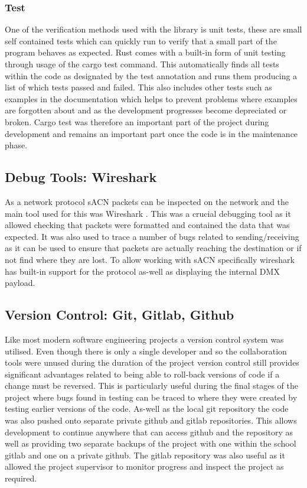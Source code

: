 \documentclass[11pt,a4paper]{article}
\begin{document}
\subsubsection{Test}
One of the verification methods used with the library is unit tests, these are small self contained tests which can quickly run to verify that a small part of the program behaves as expected. Rust comes with a built-in form of unit testing through usage of the cargo test command. This automatically finds all tests within the code as designated by the test annotation and runs them producing a list of which tests passed and failed. This also includes other tests such as examples in the documentation which helps to prevent problems where examples are forgotten about and as the development progresses become depreciated or broken. Cargo test was therefore an important part of the project during development and remains an important part once the code is in the maintenance phase.

\subsection{Debug Tools: Wireshark}
As a network protocol sACN packets can be inspected on the network and the main tool used for this was Wireshark \cite{WIRESHARK}. This was a crucial debugging tool as it allowed checking that packets were formatted and contained the data that was expected. It was also used to trace a number of bugs related to sending/receiving as it can be used to ensure that packets are actually reaching the destination or if not find where they are lost.  To allow working with sACN specifically wireshark has built-in support for the protocol as-well as displaying the internal DMX payload.

\subsection{Version Control: Git, Gitlab, Github}
Like most modern software engineering projects a version control system was utilised. Even though there is only a single developer and so the collaboration tools were unused during the duration of the project version control still provides significant advantages related to being able to roll-back versions of code if a change must be reversed. This is particularly useful during the final stages of the project where bugs found in testing can be traced to where they were created by testing earlier versions of the code. As-well as the local git repository the code was also pushed onto separate private github and gitlab repositories. This allows development to continue anywhere that can access github and the repository as well as providing two separate backups of the project with one within the school gitlab and one on a private github. The gitlab repository was also useful as it allowed the project supervisor to monitor progress and inspect the project as required.
\end{document}
